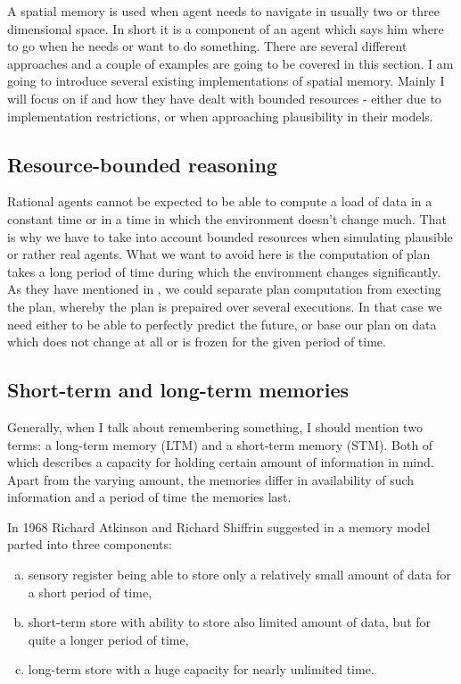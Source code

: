 A spatial memory is used when agent needs to navigate in usually two or three dimensional space. In short it is a component of an agent which says him where to go when he needs or want to do something. There are several different approaches and a couple of examples are going to be covered in this section. I am going to introduce several existing implementations of spatial memory. Mainly I will focus on if and how they have dealt with bounded resources - either due to implementation restrictions, or when approaching plausibility in their models. 

\subsection{Resource-bounded reasoning}

Rational agents cannot be expected to be able to compute a load of data in a constant time or in a time in which the environment doesn't change much. That is why we have to take into account bounded resources when simulating plausible or rather real agents. What we want to avoid here is the computation of plan takes a long period of time during which the environment changes significantly. As they have mentioned in \cite{Bratman:practicalreasoning}, we could separate plan computation from execting the plan, whereby the plan is prepaired over several executions. In that case we need either to be able to perfectly predict the future, or base our plan on data which does not change at all or is frozen for the given period of time.

\subsection{Short-term and long-term memories}

Generally, when I talk about remembering something, I should mention two terms: a long-term memory (LTM) and a short-term memory (STM). Both of which describes a capacity for holding certain amount of information in mind. Apart from the varying amount, the memories differ in availability of such information and a period of time the memories last.       

In 1968 Richard Atkinson and Richard Shiffrin suggested in \cite{Atkinson:humanmemory} a memory model parted into three components: 

\begin{enumerate}[(a)]
\item sensory register being able to store only a relatively small amount of data for a short period of time,
\item short-term store with ability to store also limited amount of data, but for quite a longer period of time,
\item long-term store with a huge capacity for nearly unlimited time.
\end{enumerate}

